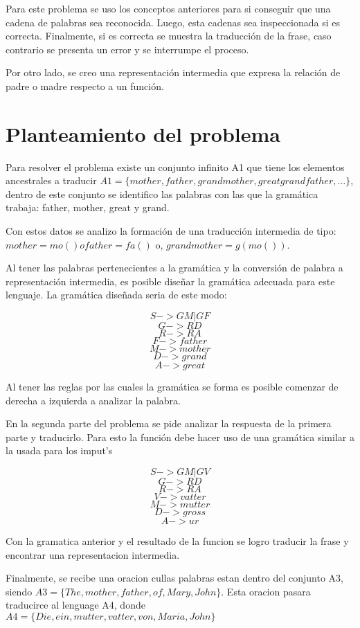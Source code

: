\documentclass[conference]{IEEEtran}
\begin{document}
Para este problema se uso los conceptos anteriores para si conseguir que una cadena de palabras sea reconocida. Luego, esta cadenas sea inspeccionada si es correcta. Finalmente, si es correcta se muestra la traducci\'on de la frase, caso contrario se presenta un error y se interrumpe el proceso.

Por otro lado, se creo una representaci\'on intermedia que expresa la relaci\'on de padre o madre respecto a un funci\'on.

\section{Planteamiento del problema}

Para resolver el problema existe un conjunto infinito A1 que tiene los elementos ancestrales a traducir $A1 = \{mother, father, grandmother, greatgrandfather, ...\}$, 
dentro de este conjunto se identifico las palabras con las que la gram\'atica trabaja: father, mother, great y grand.

Con estos datos se analizo la formaci\'on de una traducci\'on intermedia de tipo:
$mother = mo() o father = fa()$ o,
$grandmother = g(mo())$. 

Al tener las palabras pertenecientes a la gram\'atica y la conversi\'on de palabra a representaci\'on intermedia, es posible diseñar la gram\'atica adecuada para este lenguaje. La gram\'atica diseñada seria de este modo:

$$S-> G M | G F  $$
$$G-> R D $$
$$R-> R A $$
$$F-> father$$
$$M-> mother$$
$$D-> grand$$
$$A-> great$$

Al tener las reglas por las cuales la gram\'atica se forma es posible comenzar de derecha a izquierda a analizar la palabra.

En la segunda parte del problema se pide analizar la respuesta de la primera parte y traducirlo. Para esto la funci\'on debe hacer uso de una gram\'atica similar a la usada para los imput's

$$S-> G M | G V  $$
$$G-> R D $$
$$R-> R A $$
$$V-> vatter$$
$$M-> mutter$$
$$D-> gross$$
$$A-> ur$$

Con la gramatica anterior y el resultado de la funcion se logro traducir la frase y encontrar una representacion intermedia.

Finalmente, se recibe una oracion cullas palabras estan dentro del conjunto A3, siendo $A3 = \{The, mother, father, of, Mary, John \}$. Esta oracion pasara traducirce al lenguage A4, donde $A4 = \{Die, ein, mutter, vatter, von, Maria, John \}$
\end{document}
